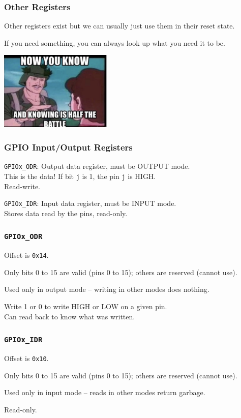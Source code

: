 \begin{frame}
\frametitle{Other Registers}

Other registers exist but we can usually just use them in their reset state.

If you need something, you can always look up what you need it to be.

\begin{center}
	\includegraphics[width=0.4\textwidth]{images/halfthebattle.jpg}
\end{center}


\end{frame}

\begin{frame}
\frametitle{GPIO Input/Output Registers}

\texttt{GPIOx\_ODR}: Output data register, must be OUTPUT mode.\\
\quad This is the data! If bit \texttt{j} is 1, the pin \texttt{j} is HIGH.\\
\quad Read-write.

\texttt{GPIOx\_IDR}: Input data register, must be INPUT mode.\\
\quad Stores data read by the pins, read-only.


\end{frame}



\begin{frame}
\frametitle{\texttt{GPIOx\_ODR}}

Offset is \texttt{0x14}.

Only bits 0 to 15 are valid (pins 0 to 15); others are reserved (cannot use).

Used only in output mode -- writing in other modes does nothing.

Write 1 or 0 to write HIGH or LOW on a given pin.\\
\quad Can read back to know what was written.

\end{frame}


\begin{frame}
\frametitle{\texttt{GPIOx\_IDR}}

Offset is \texttt{0x10}.

Only bits 0 to 15 are valid (pins 0 to 15); others are reserved (cannot use).

Used only in input mode -- reads in other modes return garbage.

Read-only.

\end{frame}


